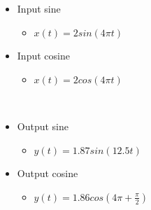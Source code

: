 \documentclass[12pt]{article}
\begin{document}
\begin{minipage}{0.5\textwidth}
\begin{flushleft} 
\begin{itemize}
\item Input sine
\begin{itemize}
\item $x(t)=2sin(4\pi t)$
\end{itemize}
\item Input cosine
\begin{itemize}
\item $x(t)=2cos(4\pi t)$
\end{itemize}
\end{itemize}
\end{flushleft}
\end{minipage}
~
\begin{minipage}{0.5\textwidth}
\begin{flushleft}
\begin{itemize}
\item Output sine
\begin{itemize}
\item $y(t)=1.87sin(12.5t)$
\end{itemize} 
\item Output cosine
\begin{itemize}
\item $y(t)=1.86cos\left(4\pi+\frac{\pi}{2}\right)$
\end{itemize}
\end{itemize}
\end{flushleft}
\end{minipage}
\end{document}
